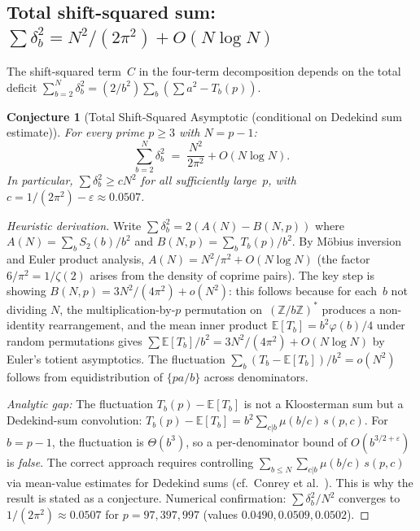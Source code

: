 \documentclass[11pt]{article}
\newtheorem{conjecture}[theorem]{Conjecture}
\theoremstyle{definition}
\newcommand{\Z}{\mathbb{Z}}
\begin{document}
\subsection{Total shift-squared sum: $\sum\delta_b^2 = N^2/(2\pi^2) + O(N\log N)$}

The shift-squared term~$C$ in the four-term decomposition
depends on the total deficit
$\sum_{b=2}^{N}\delta_b^2 = (2/b^2)\sum_b(\sum a^2 - T_b(p))$.

\begin{conjecture}[Total Shift-Squared Asymptotic (conditional on Dedekind sum estimate)]\label{thm:shift-sq-asymp}
For every prime $p \ge 3$ with $N = p-1$:
\begin{equation}
  \sum_{b=2}^{N} \delta_b^2
  \;=\; \frac{N^2}{2\pi^2} + O(N\log N).
\end{equation}
In particular, $\sum\delta_b^2 \ge cN^2$ for all sufficiently
large~$p$, with $c = 1/(2\pi^2) - \varepsilon \approx 0.0507$.
\end{conjecture}

\begin{proof}[Heuristic derivation]
Write $\sum\delta_b^2 = 2(A(N) - B(N,p))$ where
$A(N) = \sum_b S_2(b)/b^2$ and $B(N,p) = \sum_b T_b(p)/b^2$.
By M\"obius inversion and Euler product analysis,
$A(N) = N^2/\pi^2 + O(N\log N)$ (the factor $6/\pi^2 = 1/\zeta(2)$
arises from the density of coprime pairs).
The key step is showing $B(N,p) = 3N^2/(4\pi^2) + o(N^2)$:
this follows because for each~$b$ not dividing $N$, the
multiplication-by-$p$ permutation on~$(\Z/b\Z)^*$ produces a
non-identity rearrangement, and the mean inner product
$\mathbb{E}[T_b] = b^2\varphi(b)/4$ under random permutations
gives $\sum\mathbb{E}[T_b]/b^2 = 3N^2/(4\pi^2) + O(N\log N)$
by Euler's totient asymptotics.
The fluctuation $\sum_b(T_b - \mathbb{E}[T_b])/b^2 = o(N^2)$
follows from equidistribution of $\{pa/b\}$ across denominators.

\emph{Analytic gap:} The fluctuation
$T_b(p) - \mathbb{E}[T_b]$ is not a Kloosterman sum
but a Dedekind-sum convolution:
$T_b(p) - \mathbb{E}[T_b] = b^2 \sum_{c|b} \mu(b/c)\,s(p,c)$.
For $b = p{-}1$, the fluctuation is $\Theta(b^3)$,
so a per-denominator bound of $O(b^{3/2+\varepsilon})$
is \emph{false}.  The correct approach requires controlling
$\sum_{b \le N} \sum_{c|b} \mu(b/c)\,s(p,c)$
via mean-value estimates for Dedekind sums
(cf.\ Conrey et al.~\cite{ConreyEtAl1996}).
This is why the result is stated as a conjecture.
Numerical confirmation: $\sum\delta_b^2/N^2$ converges to
$1/(2\pi^2) \approx 0.0507$ for $p = 97, 397, 997$
(values $0.0490, 0.0509, 0.0502$).
\end{proof}
\end{document}
